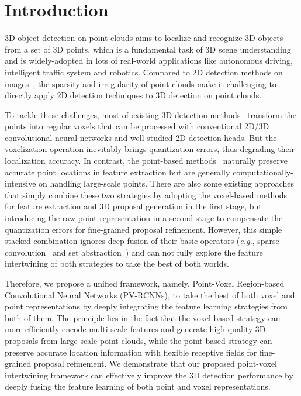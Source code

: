 \documentclass[natbib,twocolumn]{svjour3}          \smartqed  \usepackage{graphicx}
\begin{document}
\section{Introduction}
\label{intro}
3D object detection on point clouds aims to localize and recognize 3D objects from a set of 3D points, which is a fundamental task of 3D scene understanding and is widely-adopted in lots of real-world applications like autonomous driving, intelligent traffic system and robotics. 
Compared to 2D detection methods on images~\citep{girshick2015fast,ren2015faster,liu2016ssd,redmon2016you,lin2017feature, lin2018focal}, the sparsity and irregularity of point clouds make it challenging to directly apply 2D detection techniques to 3D detection on point clouds. 

To tackle these challenges, most of existing 3D detection methods~\citep{Chen2017CVPR,zhou2018voxelnet,yang2018pixor,yan2018second,lang2018pointpillars,chen2022mppnet} transform the points into regular voxels that can be processed with conventional 2D/3D convolutional neural networks and well-studied 2D detection heads. But the voxelization operation inevitably brings quantization errors, thus degrading their localization accuracy.
In contrast, the point-based methods~\citep{qi2017frustum,shi2019pointrcnn,wang2019frustum} naturally preserve accurate point locations in feature extraction but are generally computationally-intensive on handling large-scale points.
There are also some existing approaches~\citep{chen2019fast,li2021lidar} that simply combine these two strategies by adopting the voxel-based methods for feature extraction and 3D proposal generation in the first stage, but introducing the raw point representation in a second stage to compensate the quantization errors for fine-grained proposal refinement. 
However, this simple stacked combination ignores deep fusion of their basic operators (\emph{e.g.}, sparse convolution~\citep{3DSemanticSegmentationWithSubmanifoldSparseConvNet} and set abstraction~\citep{qi2017pointnet++}) and 
can not fully explore the feature intertwining of both strategies to take the best of both worlds.

Therefore, we propose a unified framework, namely, Point-Voxel Region-based Convolutional Neural Networks (PV-RCNNs), to take the best of both voxel and point representations by deeply integrating the feature learning strategies from both of them. The principle lies in the fact that the voxel-based strategy can more efficiently encode multi-scale features and generate high-quality 3D proposals from large-scale point clouds, while the point-based strategy can preserve accurate location information with flexible receptive fields for fine-grained proposal refinement. We demonstrate that our proposed point-voxel intertwining framework can effectively improve the 3D detection performance by deeply fusing the feature learning of both point and voxel representations.
 
\end{document}
